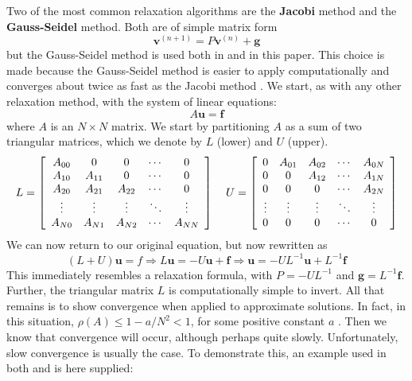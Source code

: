Two of the most common relaxation algorithms are the \textbf{Jacobi} method and the \textbf{Gauss-Seidel} method. Both are of simple matrix form \[\textbf{v}^{(n+1)}=P\textbf{v}^{(n)}+\textbf{g}\] but the Gauss-Seidel method is used both in \cite{lee14} and in this paper. This choice is made because the Gauss-Seidel method is easier to apply computationally \cite{briggs87} and converges about twice as fast as the Jacobi method \cite{lee14}. We start, as with any other relaxation method, with the system of linear equations:
\[A\textbf{u}=\textbf{f}\]
where $A$ is an $N\times N$ matrix. We start by partitioning $A$ as a sum of two triangular matrices, which we denote by $L$ (lower) and $U$ (upper).
\[L=
\left[\begin{array}{ccccc}
A_{00} & 0 & 0 & \cdots & 0 \\
A_{10} & A_{11} & 0 & \cdots & 0 \\
A_{20} & A_{21} & A_{22} & \cdots & 0 \\
\vdots & \vdots & \vdots & \ddots & \vdots \\
A_{N0} & A_{N1} & A_{N2} & \cdots & A_{NN}
\end{array}\right]
\hspace{.15in}
U=
\left[\begin{array}{ccccc}
0 & A_{01} & A_{02} & \cdots & A_{0N} \\
0 & 0 & A_{12} & \cdots & A_{1N} \\
0 & 0 & 0 & \cdots & A_{2N} \\
\vdots & \vdots & \vdots & \ddots & \vdots \\
0 & 0 & 0 & \cdots & 0
\end{array}\right]\]
We can now return to our original equation, but now rewritten as
\[(L+U)\textbf{u}=f\Rightarrow
L\textbf{u}=-U\textbf{u}+\textbf{f}\Rightarrow
\textbf{u}=-UL^{-1}\textbf{u}+L^{-1}\textbf{f}\]
This immediately resembles a relaxation formula, with $P=-UL^{-1}$ and $\textbf{g}=L^{-1}\textbf{f}$. Further, the triangular matrix $L$ is computationally simple to invert. All that remains is to show convergence when applied to approximate solutions. In fact, in this situation, $\rho(A)\leq 1-a/N^2<1$, for some positive constant $a$ \cite{lee14}. Then we know that convergence will occur, although perhaps quite slowly. Unfortunately, slow convergence is usually the case. To demonstrate this, an example used in both \cite{lee14} and \cite{briggs87} is here supplied:
